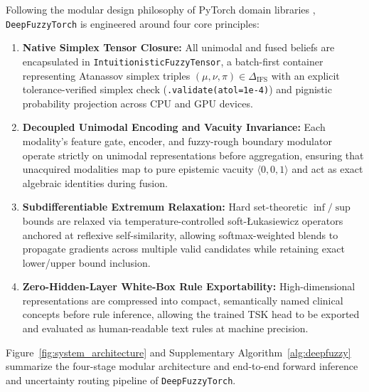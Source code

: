 \documentclass[10pt,twocolumn]{article}
\begin{document}
Following the modular design philosophy of PyTorch domain libraries
\cite{paszke2019pytorch,wang2023pypose,pineda2022theseus,%
riba2020kornia}, \texttt{DeepFuzzyTorch} is engineered around four core principles:
\begin{enumerate}[leftmargin=1.4em,itemsep=1pt,topsep=2pt]
    \item \textbf{Native Simplex Tensor Closure:} All unimodal and fused beliefs are
    encapsulated in \texttt{Intuitionistic\allowbreak Fuzzy\allowbreak Tensor}, a batch-first
    container representing Atanassov simplex triples $(\mu, \nu, \pi) \in \Delta_{\text{IFS}}$
    with an explicit tolerance-verified simplex check (\texttt{.validate(atol=1e-4)}) and
    pignistic probability projection across CPU and GPU devices.
    \item \textbf{Decoupled Unimodal Encoding and Vacuity Invariance:} Each modality's feature
    gate, encoder, and fuzzy-rough boundary modulator operate strictly on unimodal
    representations before aggregation, ensuring that unacquired modalities map to pure
    epistemic vacuity $\langle 0,0,1\rangle$ and act as exact algebraic identities during
    fusion.
    \item \textbf{Subdifferentiable Extremum Relaxation:} Hard set-theoretic $\inf/\sup$ bounds
    are relaxed via temperature-controlled soft-{\L}ukasiewicz operators anchored at reflexive
    self-similarity, allowing softmax-weighted blends to propagate gradients across multiple
    valid candidates while retaining exact lower/upper bound inclusion.
    \item \textbf{Zero-Hidden-Layer White-Box Rule Exportability:} High-dimensional
    representations are compressed into compact, semantically named clinical concepts before
    rule inference, allowing the trained TSK head to be exported and evaluated as
    human-readable text rules at machine precision.
\end{enumerate}
Figure~\ref{fig:system_architecture} and Supplementary Algorithm~\ref{alg:deepfuzzy} summarize
the four-stage
modular architecture and end-to-end forward inference and uncertainty routing pipeline of
\texttt{DeepFuzzyTorch}.
\end{document}
